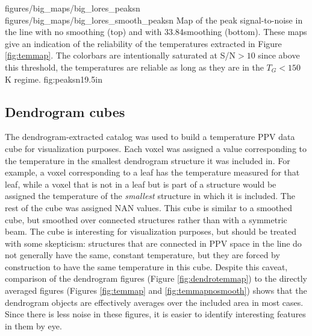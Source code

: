 \RotFigureTwoAA
{figures/big_maps/big_lores_peaksn}
{figures/big_maps/big_lores_smooth_peaksn}
{Map of the peak signal-to-noise in the \para \threeohthree line with no
smoothing (top) and with 33.84\arcsec smoothing (bottom).  
These maps give an indication of the reliability of the temperatures extracted
in Figure \ref{fig:temmap}.  The colorbars are intentionally saturated at
S/N$>10$ since above this threshold, the temperatures are reliable as long as
they are in the $T_G<150$ K regime.
}
{fig:peaksn}{1}{9.5in}

\subsection{Dendrogram cubes}

The dendrogram-extracted catalog was used to build a temperature PPV data cube
for visualization purposes.  Each voxel was assigned a value corresponding to
the temperature in the smallest dendrogram structure it was included in.  For
example, a voxel corresponding to a leaf has the temperature measured for that
leaf, while a voxel that is not in a leaf but is part of a structure would be
assigned the temperature of the \emph{smallest} structure in which it is
included.  The rest of the
cube was assigned NAN values.  This cube is similar to a smoothed cube, but
smoothed over connected structures rather than with a symmetric beam.  The cube
is interesting for visualization purposes, but should be treated with some
skepticism: structures that are connected in PPV space in the \threeohthree
line do not generally have the same, constant temperature, but they are forced
by construction to have the same temperature in this cube.  Despite this
caveat, comparison of the dendrogram figures (Figure \ref{fig:dendrotemmap}) to
the directly averaged figures (Figures \ref{fig:temmap} and
\ref{fig:temmapnosmooth}) shows that the dendrogram objects are effectively
averages over the included area in most cases.  Since there is less noise in
these figures, it is easier to identify interesting features in them by eye.




